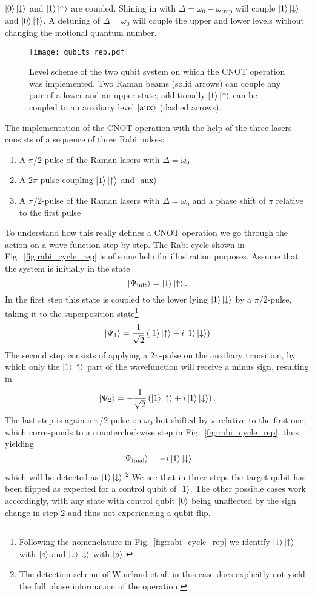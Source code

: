 $\ket{0}\ket{\downarrow}$ and $\ket{1}\ket{\uparrow}$ are coupled. Shining in
with $\Delta = \omega_0 - \omega_\text{trap}$ will couple
$\ket{1}\ket{\downarrow}$ and $\ket{0}\ket{\uparrow}$. A detuning of $\Delta =
\omega_0$ will couple the upper and lower levels without changing the motional
quantum number. 
\begin{figure}[t]
  \centering
  \texttt{[image: qubits\_rep.pdf]}
  \caption{Level scheme of the two qubit system on which the CNOT operation was 
   implemented. Two Raman beams (solid arrows) can couple any pair of a lower 
   and an upper state, additionally $\ket{1}\ket{\uparrow}$ can be coupled to an 
 auxiliary level $\ket{\text{aux}}$ (dashed arrows).}
  \label{fig:qubits_rep}
\end{figure}

The implementation of the CNOT operation with the help of the three lasers
consists of a sequence of three Rabi pulses:
\begin{enumerate}
  \item A $\pi/2$-pulse of the Raman lasers with $\Delta=\omega_0$
  \item A 2$\pi$-pulse coupling $\ket{1}\ket{\uparrow}$ and $\ket{\text{aux}}$
  \item A $\pi/2$-pulse of the Raman lasers with $\Delta=\omega_0$ and a phase shift of $\pi$ relative
    to the first pulse
\end{enumerate}
To understand how this really defines a CNOT operation we go through the action
on a wave function step by step. The Rabi cycle shown in
Fig.~\ref{fig:rabi_cycle_rep} is of some help for illustration purposes. Assume
that the system is initially in the state
$$ \ket{\Psi_\text{init}} = \ket{1}\ket{\uparrow}.$$
In the first step this state is coupled to the lower lying $\ket{1}\ket{\downarrow}$ by a
$\pi/2$-pulse, taking it to the superposition state\footnote{Following the
nomenclature in Fig.~\ref{fig:rabi_cycle_rep} we identify
$\ket{1}\ket{\uparrow}$ with $\ket{e}$ and $\ket{1}\ket{\downarrow}$ with
$\ket{g}$.}
$$ \ket{\Psi_1} = \frac{1}{\sqrt{2}}\left(\ket{1}\ket{\uparrow}
-i\ket{1}\ket{\downarrow}\right)$$
The second step consists of applying a 2$\pi$-pulse on the auxiliary transition,
by which only the $\ket{1}\ket{\uparrow}$ part of the wavefunction will receive
a minus sign, resulting in
$$ \ket{\Psi_2} = -\frac{1}{\sqrt{2}}\left(\ket{1}\ket{\uparrow} + i
\ket{1}\ket{\downarrow}\right).$$
The last step is again a $\pi/2$-pulse on $\omega_0$ but shifted by $\pi$
relative to the first one, which corresponds to a counterclockwise step in
Fig.~\ref{fig:rabi_cycle_rep}, thus yielding
$$ \ket{\Psi_\text{final}} = -i\ket{1}\ket{\downarrow}$$
which will be detected as $\ket{1}\ket{\downarrow}$.\footnote{The detection
scheme of Wineland et al. in this case does explicitly not yield the full phase
information of the operation.} We see that in three steps
the target qubit has been flipped as expected for a control qubit of $\ket{1}$.
The other possible cases work accordingly, with any state with control qubit 
$\ket{0}$ being unaffected by the sign change in step 2 and thus not
experiencing a qubit flip.

